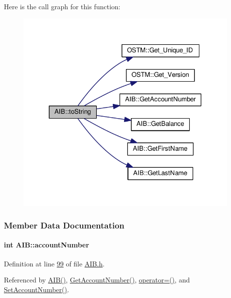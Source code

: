 Here is the call graph for this function\+:
\nopagebreak
\begin{figure}[H]
\begin{center}
\leavevmode
\includegraphics[width=314pt]{class_a_i_b_aff0f0a0db75a17efec4bd500b888232d_aff0f0a0db75a17efec4bd500b888232d_cgraph}
\end{center}
\end{figure}




\subsubsection{Member Data Documentation}
\paragraph[{\texorpdfstring{account\+Number}{accountNumber}}]{\setlength{\rightskip}{0pt plus 5cm}int A\+I\+B\+::account\+Number\hspace{0.3cm}{\ttfamily [private]}}\hypertarget{class_a_i_b_aafc08efeec5b8c800c32ee32f20603a7_aafc08efeec5b8c800c32ee32f20603a7}{}\label{class_a_i_b_aafc08efeec5b8c800c32ee32f20603a7_aafc08efeec5b8c800c32ee32f20603a7}


Definition at line \hyperlink{_a_i_b_8h_source_l00099}{99} of file \hyperlink{_a_i_b_8h_source}{A\+I\+B.\+h}.



Referenced by \hyperlink{_a_i_b_8h_source_l00023}{A\+I\+B()}, \hyperlink{_a_i_b_8cpp_source_l00075}{Get\+Account\+Number()}, \hyperlink{_a_i_b_8h_source_l00066}{operator=()}, and \hyperlink{_a_i_b_8cpp_source_l00071}{Set\+Account\+Number()}.

